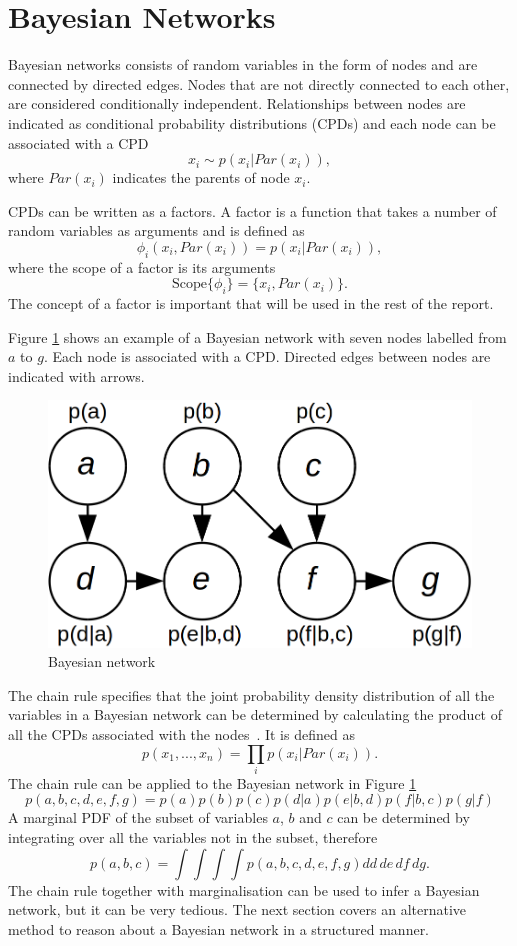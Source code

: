 \documentclass[12pt,oneside,openany,a4paper, %
afrikaans,english,
]{memoir}
\numberwithin{equation}{chapter}
\begin{document}
\section{Bayesian Networks}
Bayesian networks consists of random variables in the form of nodes and are connected by directed edges. Nodes that are not directly connected to each other, are considered conditionally independent. Relationships between nodes are indicated as conditional probability distributions (CPDs) and each node can be associated with a CPD
\begin{equation}
x_i \sim p(x_i|Par(x_i)),
\end{equation}
where $Par(x_i)$ indicates the parents of node $x_i$.

CPDs can be written as a factors. A factor is a function that takes a number of random variables as arguments and is defined as
\begin{equation}
\phi_i(x_i, Par(x_i)) = p(x_i|Par(x_i)),
\end{equation}
where the scope of a factor is its arguments 
\begin{equation}
\text{Scope}\{\phi_i\} = \{x_i, Par(x_i)\}.
\end{equation}
The concept of a factor is important that will be used in the rest of the report.

Figure \ref{fig:bays_pgm} shows an example of a Bayesian network with seven nodes labelled from $a$ to $g$. Each node is associated with a CPD. Directed edges between nodes are indicated with arrows.
\begin{figure}[H]
  \includegraphics[width=0.5\linewidth]{Figures/bayesian_pgm.png}
  \centering
  \caption{Bayesian network}
  \label{fig:bays_pgm}
\end{figure}
The chain rule specifies that the joint probability density distribution of all the variables in a Bayesian network can be determined by calculating the product of all the CPDs associated with the nodes~\citep{koller}. It is defined as
\begin{equation}
p(x_1, ..., x_n) = \prod_i p(x_i|Par(x_i)).
\end{equation}
The chain rule can be applied to the Bayesian network in Figure \ref{fig:bays_pgm}
\begin{equation}
p(a,b,c,d,e,f,g) = p(a)p(b)p(c)p(d|a)p(e|b,d)p(f|b,c)p(g|f)
\end{equation}
A marginal PDF of the subset of variables $a$, $b$ and $c$ can be determined by integrating over all the variables not in the subset, therefore
\begin{equation}
p(a,b,c) = \int\int\int\int p(a,b,c,d,e,f,g)dd\,de\,df\,dg.
\end{equation}
The chain rule together with marginalisation can be used to infer a Bayesian network, but it can be very tedious. The next section covers an alternative method to reason about a Bayesian network in a structured manner.
\end{document}
